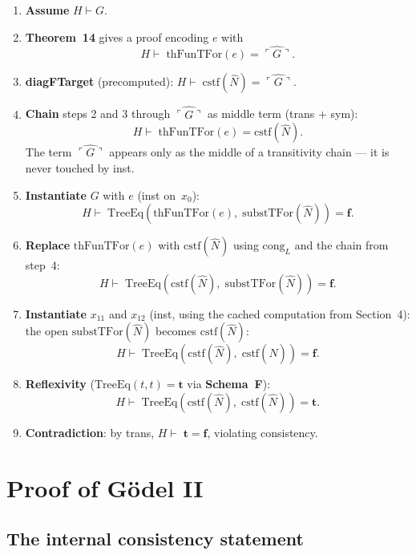\documentclass[11pt]{article}
\newcommand{\trueT}{\mathbf{t}}
\newcommand{\falseT}{\mathbf{f}}
\newcommand{\SchemaF}{\textbf{Schema~F}}
\newcommand{\code}[1]{\ulcorner #1 \urcorner}
\newcommand{\reify}[1]{\widehat{#1}}
\newcommand{\thFunTFor}{\mathrm{thFunTFor}}
\newcommand{\cstf}{\mathrm{cstf}}
\newcommand{\TreeEq}{\mathrm{TreeEq}}
\begin{document}
\begin{enumerate}
\item \textbf{Assume} $H \vdash G$.

\item \textbf{Theorem~14} gives a proof encoding $e$ with
  \[
    H \vdash\; \thFunTFor(e) = \reify{\code{G}}.
  \]

\item \textbf{diagFTarget} (precomputed):
  $H \vdash\; \cstf(\hat{N}) = \reify{\code{G}}$.

\item \textbf{Chain} steps 2 and 3 through
  $\reify{\code{G}}$ as middle term (trans + sym):
  \[
    H \vdash\; \thFunTFor(e) = \cstf(\hat{N}).
  \]
  The term $\reify{\code{G}}$ appears only as the
  middle of a transitivity chain --- it is never touched by inst.

\item \textbf{Instantiate} $G$ with $e$ (inst on~$x_0$):
  \[
    H \vdash\;
    \TreeEq(\thFunTFor(e),\;
    \mathrm{substTFor}(\hat{N})) = \falseT.
  \]

\item \textbf{Replace} $\thFunTFor(e)$ with
  $\cstf(\hat{N})$ using $\mathrm{cong}_L$ and the chain
  from step~4:
  \[
    H \vdash\;
    \TreeEq(\cstf(\hat{N}),\;
    \mathrm{substTFor}(\hat{N})) = \falseT.
  \]

\item \textbf{Instantiate} $x_{11}$ and $x_{12}$ (inst, using
  the cached computation from Section~4):
  the open $\mathrm{substTFor}(\hat{N})$ becomes
  $\cstf(\hat{N})$:
  \[
    H \vdash\;
    \TreeEq(\cstf(\hat{N}),\;
    \cstf(\hat{N})) = \falseT.
  \]

\item \textbf{Reflexivity} ($\TreeEq(t,t) = \trueT$ via \SchemaF):
  \[
    H \vdash\;
    \TreeEq(\cstf(\hat{N}),\;
    \cstf(\hat{N})) = \trueT.
  \]

\item \textbf{Contradiction}: by trans,
  $H \vdash\; \trueT = \falseT$, violating consistency.
\end{enumerate}

\section{Proof of G\"odel II}

\subsection{The internal consistency statement}
\end{document}
